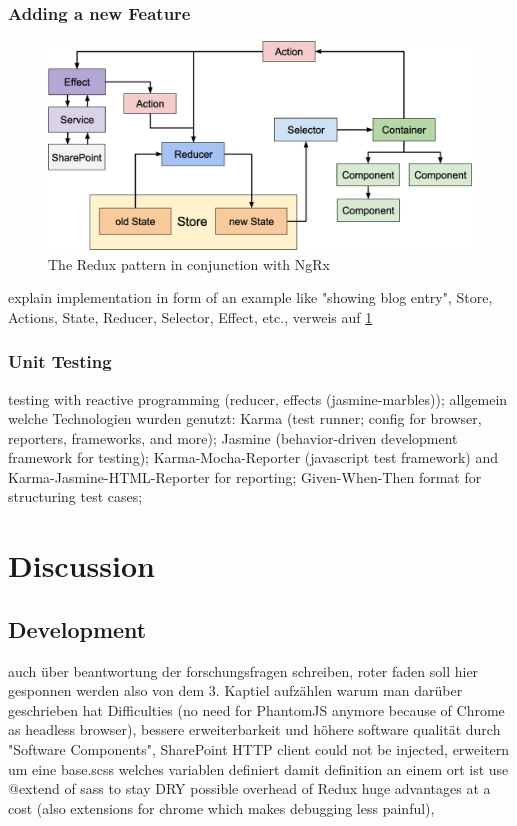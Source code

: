 \documentclass[Bachelor,BIF,english]{twbook}
\begin{document}
\subsection{Adding a new Feature}
\begin{figure}[!htbp]
\centering
\includegraphics[width=0.75\linewidth]{PICs/ngrx_redux_structure.eps}
\caption{The Redux pattern in conjunction with NgRx}\label{Fig6}
\end{figure}
explain implementation in form of an example like "showing blog entry", Store, Actions, State, Reducer, Selector, Effect, etc., verweis auf \ref{Fig6}

\subsection{Unit Testing}
testing with reactive programming (reducer, effects (jasmine-marbles)); allgemein welche Technologien wurden genutzt: Karma \cite{Karma} (test runner; config for browser, reporters, frameworks, and more); Jasmine \cite{Jasmine} (behavior-driven development framework for testing); Karma-Mocha-Reporter \cite{KarmaMocha} (javascript test framework) and Karma-Jasmine-HTML-Reporter \cite{KarmaJasmineHTML} for reporting; Given-When-Then \cite{GivenWhenThen} format for structuring test cases; 

\clearpage


\chapter{Discussion}

\section{Development}
auch über beantwortung der forschungsfragen schreiben, 
roter faden soll hier gesponnen werden also von dem 3. Kaptiel aufzählen warum man darüber geschrieben hat
Difficulties (no need for PhantomJS anymore because of Chrome as headless browser), 
bessere erweiterbarkeit und höhere software qualität durch "Software Components", 
SharePoint HTTP client could not be injected, 
erweitern um eine base.scss welches variablen definiert damit definition an einem ort ist
use @extend of sass to stay DRY
possible overhead of Redux huge advantages at a cost (also extensions for chrome which makes debugging less painful), 
\end{document}
